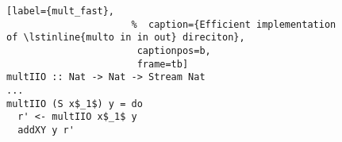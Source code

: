 \begin{figure}[!t]
  \centering
  \begin{minipage}{\columnwidth}
    \begin{lstlisting}[label={mult_fast},
                      %  caption={Efficient implementation of \lstinline{multo in in out} direciton},
                       captionpos=b,
                       frame=tb]
multIIO :: Nat -> Nat -> Stream Nat
...
multIIO (S x$_1$) y = do
  r' <- multIIO x$_1$ y
  addXY y r'
    \end{lstlisting}
  \end{minipage}
\end{figure}
